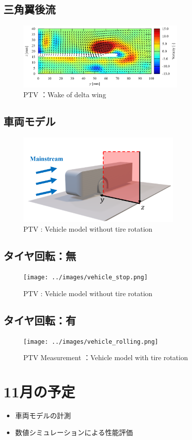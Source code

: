 \documentclass[twocolumn,a4j]{jsarticle}
\begin{document}
\subsection{三角翼後流}
\begin{figure}[htbp]
	\centering
	\includegraphics[keepaspectratio, width=82mm]{../images/delta_wing.png}
	\caption{PTV ：Wake of delta wing}
\end{figure}

\subsection{車両モデル}
\begin{figure}[htbp]
	\centering
	\includegraphics[keepaspectratio, width=80mm]{../images/vehicle_model.png}
	\caption{PTV : Vehicle model without tire rotation}
\end{figure}


\subsection{タイヤ回転：無}
\begin{figure}[htbp]
	\centering
	\texttt{[image: ../images/vehicle\_stop.png]}
	\caption{PTV : Vehicle model without tire rotation}
\end{figure}


\subsection{タイヤ回転：有}
\begin{figure}[htbp]
	\centering
	\texttt{[image: ../images/vehicle\_rolling.png]}
	\caption{PTV Measurement ：Vehicle model with tire rotation}
\end{figure}



\section{11月の予定}
\begin{itemize}
	\item 車両モデルの計測
	\item 数値シミュレーションによる性能評価
\end{itemize}
\end{document}
